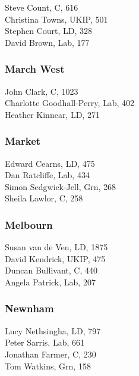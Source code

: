 \documentclass[a4paper,openany,10pt]{book}
\begin{document}


Steve Count, C, 616\\
Christina Towns, UKIP, 501\\
Stephen Court, LD, 328\\
David Brown, Lab, 177\\


\subsubsection*{March West}



John Clark, C, 1023\\
Charlotte Goodhall-Perry, Lab, 402\\
Heather Kinnear, LD, 271\\


\subsubsection*{Market}



Edward Cearns, LD, 475\\
Dan Ratcliffe, Lab, 434\\
Simon Sedgwick-Jell, Grn, 268\\
Sheila Lawlor, C, 258\\


\subsubsection*{Melbourn}



Susan van de Ven, LD, 1875\\
David Kendrick, UKIP, 475\\
Duncan Bullivant, C, 440\\
Angela Patrick, Lab, 207\\


\subsubsection*{Newnham}



Lucy Nethsingha, LD, 797\\
Peter Sarris, Lab, 661\\
Jonathan Farmer, C, 230\\
Tom Watkins, Grn, 158\\
\end{document}
